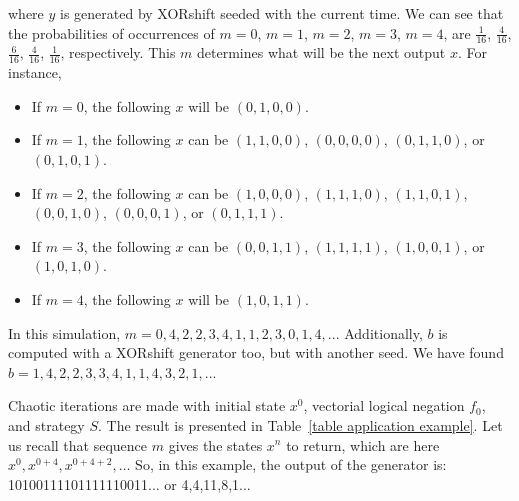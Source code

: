 \noindent where $y$ is generated by XORshift seeded with the current time. We can see that the probabilities of occurrences of $m=0$, $m=1$, $m=2$, $m=3$, $m=4$, are $\frac{1}{16}$, $\frac{4}{16}$, $\frac{6}{16}$, $\frac{4}{16}$, $\frac{1}{16}$, respectively. This $m$ determines what will be the next output $x$. For instance,
\begin{itemize}
\item If $m=0$, the following $x$ will be $( 0, 1, 0, 0)$.
\item If $m=1$, the following $x$ can be $( 1, 1, 0, 0)$, $( 0, 0, 0, 0)$, $( 0, 1, 1, 0)$, or $( 0, 1, 0, 1)$.
\item If $m=2$, the following $x$ can be $( 1, 0, 0, 0)$, $( 1, 1, 1, 0)$, $( 1, 1, 0, 1)$, $( 0, 0, 1, 0)$, $( 0, 0, 0, 1)$, or $( 0, 1, 1, 1)$.
\item If $m=3$, the following $x$ can be $( 0, 0, 1, 1)$, $( 1, 1, 1, 1)$, $( 1, 0, 0, 1)$, or $( 1, 0, 1, 0)$.
\item If $m=4$, the following $x$ will be $( 1, 0, 1, 1)$.
\end{itemize}

In this simulation, $m = 0, 4, 2, 2, 3, 4, 1, 1, 2, 3, 0, 1, 4,...$ Additionally, $b$ is computed with a XORshift generator too, but with another seed. We have found $b = 1, 4, 2, 2, 3, 3, 4, 1, 1, 4, 3, 2, 1,...$

Chaotic iterations are made with initial state $x^0$, vectorial logical negation $f_0$, and
strategy $S$. The result is presented in Table~\ref{table application example}. Let us recall that sequence $m$ gives the states $x^n$ to return, which are here $x^0, x^{0+4}, x^{0+4+2}, \hdots$ So, in this example, the output of the generator is: 10100111101111110011... or 4,4,11,8,1...




